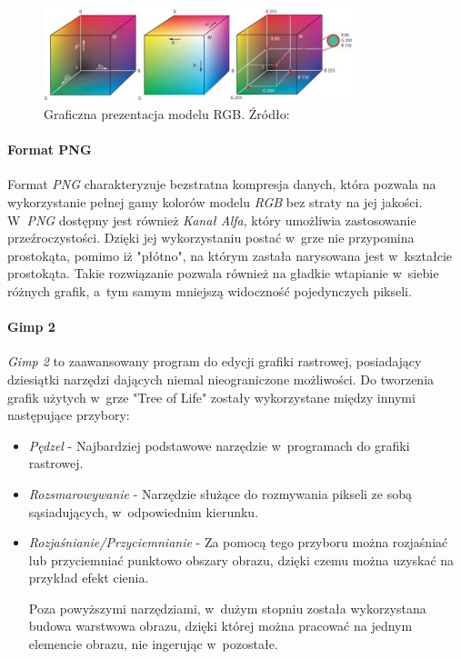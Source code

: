 \documentclass[12pt,a4paper,oneside]{book}
\theoremstyle{definition}
\numberwithin{equation}{chapter}
\begin{document}
\begin{figure}[hpt!]
        \centering
        \includegraphics[width=0.8\textwidth]{images/RGB.jpg}
        \caption{Graficzna prezentacja modelu RGB. Źródło: \cite{RGB}}
        \label{RGB}
\end{figure}

\paragraph{Format PNG}\hfill \break
\par Format \textit{PNG} charakteryzuje bezstratna kompresja danych, która pozwala na wykorzystanie pełnej gamy kolorów modelu \textit{RGB} bez straty na jej jakości. W~\textit{PNG} dostępny jest również \textit{Kanał Alfa}, który umożliwia zastosowanie przeźroczystości. Dzięki jej wykorzystaniu postać w~grze nie przypomina prostokąta, pomimo iż "płótno", na którym zastała narysowana jest w~kształcie prostokąta. Takie rozwiązanie pozwala również na gładkie wtapianie w~siebie różnych grafik, a~tym samym mniejszą widoczność pojedynczych pikseli.  

\paragraph{Gimp 2}\hfill \break
\par \textit{Gimp 2} to zaawansowany program do edycji grafiki rastrowej, posiadający dziesiątki narzędzi dających niemal nieograniczone możliwości. Do tworzenia grafik użytych w~grze "Tree of Life" zostały wykorzystane między innymi następujące przybory:

\begin{itemize}

\item \textit{Pędzel} - Najbardziej podstawowe narzędzie w~programach do grafiki rastrowej.

\item \textit{Rozsmarowywanie} - Narzędzie służące do rozmywania pikseli ze sobą sąsiadujących, w~odpowiednim kierunku.

\item \textit{Rozjaśnianie/Przyciemnianie} - Za pomocą tego przyboru można rozjaśniać lub przyciemniać punktowo obszary obrazu, dzięki czemu można uzyskać na przykład efekt cienia.

\par Poza  powyższymi narzędziami, w~dużym stopniu została wykorzystana budowa warstwowa obrazu, dzięki której można pracować na jednym elemencie obrazu, nie ingerując w~pozostałe.

\end{itemize}
\end{document}
